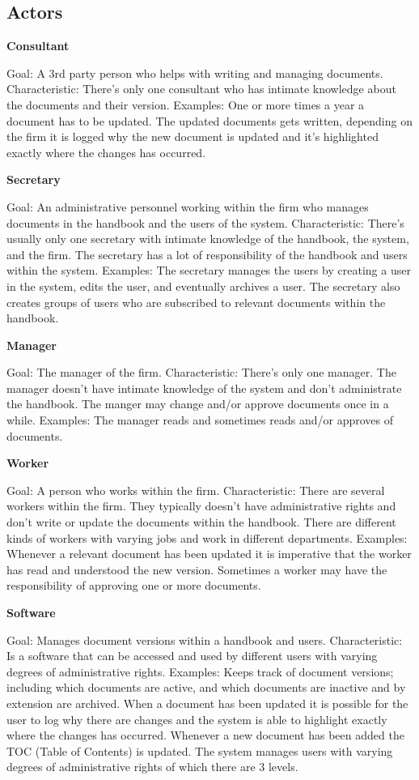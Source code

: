 \subsection{Actors}

\textbf{Consultant}

Goal: A 3rd party person who helps with writing and managing documents.
Characteristic: There’s only one consultant who has intimate knowledge about the documents and their version.
Examples: One or more times a year a document has to be updated. The updated documents gets written, depending on the firm it is logged why the new document is updated and it’s highlighted exactly where the changes has occurred.

\textbf{Secretary}

Goal: An administrative personnel working within the firm who manages documents in the handbook and the users of the system.
Characteristic: There’s usually only one secretary with intimate knowledge of the handbook, the system, and the firm. The secretary has a lot of responsibility of the handbook and users within the system.
Examples: The secretary manages the users by creating a user in the system, edits the user, and eventually archives a user. The secretary also creates groups of users who are subscribed to relevant documents within the handbook.

\textbf{Manager}

Goal: The manager of the firm.
Characteristic: There’s only one manager. The manager doesn’t have intimate knowledge of the system and don’t administrate the handbook. The manger may change and/or approve documents once in a while.
Examples: The manager reads and sometimes reads and/or approves of documents.

\textbf{Worker}

Goal: A person who works within the firm.
Characteristic: There are several workers within the firm. They typically doesn’t have administrative rights and don’t write or update the documents within the handbook. There are different kinds of workers with varying jobs and work in different departments.
Examples: Whenever a relevant document has been updated it is imperative that the worker has read and understood the new version. Sometimes a worker may have the responsibility of approving one or more documents.

\textbf{Software}

Goal: Manages document versions within a handbook and users.
Characteristic: Is a software that can be accessed and used by different users with varying degrees of administrative rights.
Examples: Keeps track of document versions; including which documents are active, and which documents are inactive and by extension are archived. When a document has been updated it is possible for the user to log why there are changes and the system is able to highlight exactly where the changes has occurred. Whenever a new document has been added the TOC (Table of Contents) is updated. The system manages users with varying degrees of administrative rights of which there are 3 levels.


